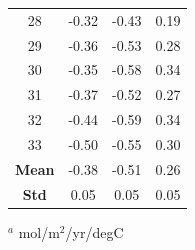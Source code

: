 \documentclass[12pt]{article}
\begin{document}
\begin{table}
\begin{tabular}{c c c c}
	28 &  -0.32 &    -0.43 &       0.19 \\
	29 &  -0.36 &    -0.53 &       0.28 \\
	30 &  -0.35 &    -0.58 &       0.34 \\
	31 &  -0.37 &    -0.52 &       0.27 \\
	32 &  -0.44 &    -0.59 &       0.34 \\
	33 &  -0.50 &    -0.55 &       0.30 \\
	\bottomrule
	\textbf{Mean} & -0.38 & -0.51 & 0.26  \\
	\textbf{Std} & 0.05 & 0.05 & 0.05  \\
\end{tabular}
\begin{tablenotes}
	\centering
	\item $^{a}$ mol/m$^{2}$/yr/degC
\end{tablenotes}
\label{tab:HumCS-ENSO-5lag}
\end{table}


\clearpage

\end{document}
